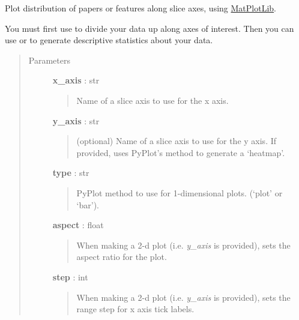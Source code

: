 \documentclass[letterpaper,10pt,english]{sphinxmanual}
\begin{document}
\begin{fulllineitems}
\begin{fulllineitems}
\end{fulllineitems}


\begin{fulllineitems}
\label{tethne.classes.corpus:tethne.classes.corpus.Corpus.plot_distribution}
Plot distribution of papers or features along slice axes, using
\href{http://matplotlib.org/}{MatPlotLib}.

You must first use  to divide your data up along axes of
interest. Then you can use  or
 to generate descriptive statistics about your
data.
\begin{quote}\begin{description}
\item[{Parameters}] \leavevmode
\textbf{x\_axis} : str
\begin{quote}

Name of a slice axis to use for the x axis.
\end{quote}

\textbf{y\_axis} : str
\begin{quote}

(optional) Name of a slice axis to use for the y axis. If provided,
uses PyPlot's  method to generate a `heatmap'.
\end{quote}

\textbf{type} : str
\begin{quote}

PyPlot method to use for 1-dimensional plots. (`plot' or `bar').
\end{quote}

\textbf{aspect} : float
\begin{quote}

When making a 2-d plot (i.e. \emph{y\_axis} is provided), sets the aspect
ratio for the plot.
\end{quote}

\textbf{step} : int
\begin{quote}

When making a 2-d plot (i.e. \emph{y\_axis} is provided), sets the range
step for x axis tick labels.
\end{quote}


\end{description}
\end{quote}
\end{fulllineitems}
\end{fulllineitems}
\end{document}
